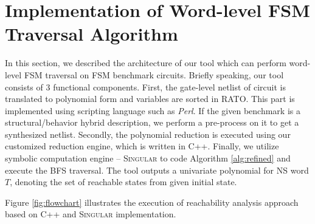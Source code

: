 \section{Implementation of Word-level FSM Traversal Algorithm}
In this section, we described the architecture of our tool which can perform word-level FSM traversal
on FSM benchmark circuits.
Briefly speaking, our tool consists of 3 functional components.
First, the gate-level netlist of circuit is translated to polynomial form and variables are sorted in 
RATO. This part is implemented using scripting language such as \emph{Perl}. If 
the given benchmark is a structural/behavior hybrid description, we perform a pre-process on it to get a synthesized netlist.
Secondly, the polynomial reduction is executed using our customized reduction engine, which is written in C++.
Finally, we utilize symbolic computation engine -- \textsc{Singular} \cite{DGPS} to code Algorithm 
\ref{alg:refined} and execute the BFS traversal. The tool outputs a univariate polynomial 
for NS word $T$, denoting the set of reachable states from given initial state.

Figure \ref{fig:flowchart} illustrates the execution of reachability analysis approach
based on C++ and \textsc{Singular} implementation.

\begin{figure}[H]
\end{figure}

